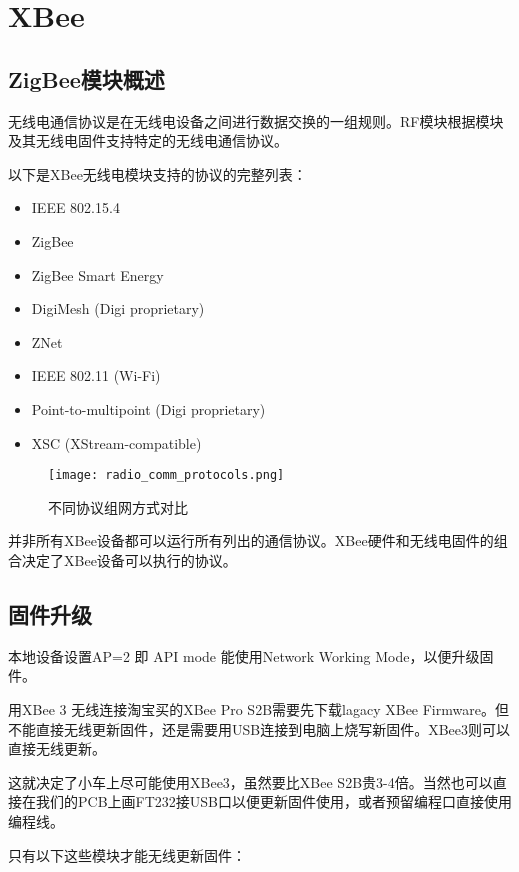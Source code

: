 \chapter{XBee}
\label{cha:XBee}

\section{ZigBee模块概述}

无线电通信协议是在无线电设备之间进行数据交换的一组规则。RF模块根据模块及其无线电固件支持特定的无线电通信协议。

以下是XBee无线电模块支持的协议的完整列表：

\begin{itemize}
    \item IEEE 802.15.4
    \item ZigBee
    \item ZigBee Smart Energy
    \item DigiMesh (Digi proprietary)
    \item ZNet
    \item IEEE 802.11 (Wi-Fi)
    \item Point-to-multipoint (Digi proprietary)
    \item XSC (XStream-compatible)
\end{itemize}

\begin{figure}[htbp]
    \centering
    \texttt{[image: radio\_comm\_protocols.png]}
    \caption{不同协议组网方式对比}
    \label{fig:radio_comm_protocols}
\end{figure}

并非所有XBee设备都可以运行所有列出的通信协议。XBee硬件和无线电固件的组合决定了XBee设备可以执行的协议。

\section{固件升级}

本地设备设置AP=2 即 API mode 能使用Network Working Mode，以便升级固件。

用XBee 3 无线连接淘宝买的XBee Pro S2B需要先下载lagacy XBee Firmware。但不能直接无线更新固件，还是需要用USB连接到电脑上烧写新固件。XBee3则可以直接无线更新。

这就决定了小车上尽可能使用XBee3，虽然要比XBee S2B贵3-4倍。当然也可以直接在我们的PCB上画FT232接USB口以便更新固件使用，或者预留编程口直接使用编程线。

只有以下这些模块才能无线更新固件：

